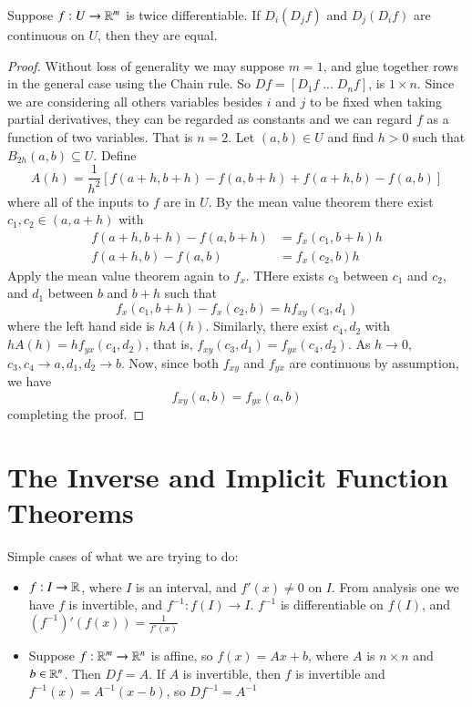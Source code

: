 \begin{prop}
    Suppose $f:U\rightarrow \mathbb R^m$ is twice differentiable. If $D_i(D_jf)$ and $D_j(D_if)$ are continuous on $U$, then they are equal.
\end{prop}
\begin{proof}
    Without loss of generality we may suppose $m = 1$, and glue together rows in the general case using the Chain rule. So $Df = [D_1f\;...\;D_nf]$, is $1 \times n$. Since we are considering all others variables besides $i$ and $j$ to be fixed when taking partial derivatives, they can be regarded as constants and we can regard $f$ as a function of two variables. That is $n = 2$. Let $(a,b) \in U$ and find $h > 0$ such that $B_{2h}(a,b) \subseteq U$. Define $$A(h) = \frac{1}{h^2}\left[f(a+h,b+h) - f(a,b+h) + f(a+h,b)-f(a,b)\right]$$ where all of the inputs to $f$ are in $U$. By the mean value theorem there exist $c_1,c_2 \in (a,a+h)$ with \begin{align*}
        f(a+h,b+h)-f(a,b+h) &= f_x(c_1,b+h)h \\
        f(a+h,b) - f(a,b) &= f_x(c_2,b)h
    \end{align*}
    Apply the mean value theorem again to $f_x$. THere exists $c_3$ between $c_1$ and $c_2$, and $d_1$ between $b$ and $b+h$ such that $$f_x(c_1,b+h) - f_x(c_2 ,b) = hf_{xy}(c_3,d_1)$$ where the left hand side is $hA(h)$. Similarly, there exist $c_4,d_2$ with $hA(h) = hf_{yx}(c_4,d_2)$, that is, $f_{xy}(c_3,d_1) = f_{yx}(c_4,d_2)$. As $h\rightarrow 0$, $c_3,c_4\rightarrow a,d_1,d_2\rightarrow b$. Now, since both $f_{xy}$ and $f_{yx}$ are continuous by assumption, we have $$f_{xy}(a,b) = f_{yx}(a,b)$$ completing the proof.
\end{proof}


\section{The Inverse and Implicit Function Theorems}


Simple cases of what we are trying to do: \begin{itemize}
    \item $f:I\rightarrow \mathbb R$, where $I$ is an interval, and $f'(x) \neq 0$ on $I$. From analysis one we have $f$ is invertible, and $f^{-1}:f(I)\rightarrow I$. $f^{-1}$ is differentiable on $f(I)$, and $(f^{-1})'(f(x)) = \frac{1}{f'(x)}$
    \item Suppose $f:\mathbb R^m\rightarrow \mathbb R^n$ is affine, so $f(x) = Ax+b$, where $A$ is $n\times n$ and $b \in \mathbb R^n$. Then $Df = A$. If $A$ is invertible, then $f$ is invertible and $f^{-1}(x) = A^{-1}(x-b)$, so $Df^{-1} = A^{-1}$
\end{itemize}

